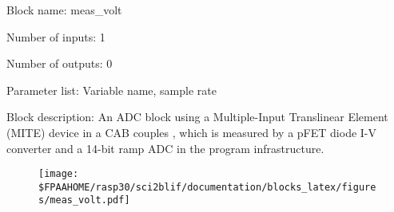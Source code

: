 \pagebreak

Block name: meas\_volt

Number of inputs: 1

Number of outputs: 0

Parameter list: Variable name, sample rate

Block description: 
An ADC block using a Multiple-Input Translinear Element (MITE) device in a CAB couples , which is measured by a pFET diode I-V converter and a 14-bit ramp ADC in the program infrastructure.

\begin{figure}[H]  %
\texttt{[image: \$FPAAHOME/rasp30/sci2blif/documentation/blocks\_latex/figures/meas\_volt.pdf]}
\end{figure}

